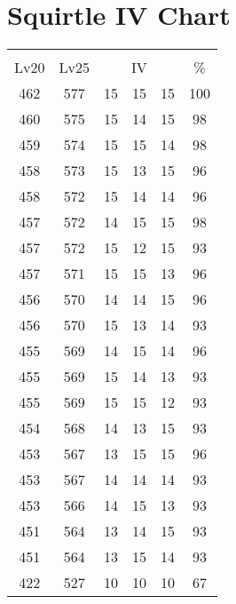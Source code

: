 \documentclass{article}%
\begin{document}
%
\normalsize%
\section{Squirtle IV Chart}%
\label{sec:Squirtle IV Chart}%
\renewcommand{\arraystretch}{1.5}%
\begin{tabular}{|c|c|c|c|c|c|}%
\hline%
\multicolumn{6}{|c|}{\textcolor{white}{ 
\linebreak{Squirtle}
}%
\cellcolor{black}}\\%
\multicolumn{1}{|c}{Lv20}&\multicolumn{1}{c|}{Lv25}&\multicolumn{3}{c|}{IV}&\multicolumn{1}{|c|}{\%}\\%
\hline%
\rowcolor{color100}%
462&577&15&15&15&100\\%
\hline%
\rowcolor{color98}%
460&575&15&14&15&98\\%
\hline%
\rowcolor{color98}%
459&574&15&15&14&98\\%
\hline%
\rowcolor{color96}%
458&573&15&13&15&96\\%
\hline%
\rowcolor{color96}%
458&572&15&14&14&96\\%
\hline%
\rowcolor{color98}%
457&572&14&15&15&98\\%
\hline%
\rowcolor{color93}%
457&572&15&12&15&93\\%
\hline%
\rowcolor{color96}%
457&571&15&15&13&96\\%
\hline%
\rowcolor{color96}%
456&570&14&14&15&96\\%
\hline%
\rowcolor{color93}%
456&570&15&13&14&93\\%
\hline%
\rowcolor{color96}%
455&569&14&15&14&96\\%
\hline%
\rowcolor{color93}%
455&569&15&14&13&93\\%
\hline%
\rowcolor{color93}%
455&569&15&15&12&93\\%
\hline%
\rowcolor{color93}%
454&568&14&13&15&93\\%
\hline%
\rowcolor{color96}%
453&567&13&15&15&96\\%
\hline%
\rowcolor{color93}%
453&567&14&14&14&93\\%
\hline%
\rowcolor{color93}%
453&566&14&15&13&93\\%
\hline%
\rowcolor{color93}%
451&564&13&14&15&93\\%
\hline%
\rowcolor{color93}%
451&564&13&15&14&93\\%
\hline%
\rowcolor{color91}%
422&527&10&10&10&67\\%
\end{tabular}

%
\end{document}

